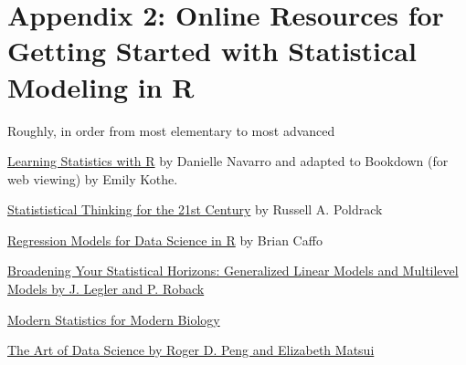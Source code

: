 \documentclass[]{book}
\begin{document}
\chapter*{Appendix 2: Online Resources for Getting Started with
Statistical Modeling in
R}\label{appendix-2-online-resources-for-getting-started-with-statistical-modeling-in-r}

Roughly, in order from most elementary to most advanced

\href{https://https://learningstatisticswithr-bookdown.netlify.com}{Learning
Statistics with R} by Danielle Navarro and adapted to Bookdown (for web
viewing) by Emily Kothe.

\href{http://statsthinking21.org}{Statististical Thinking for the 21st
Century} by Russell A. Poldrack

\href{https://leanpub.com/regmods}{Regression Models for Data Science in
R} by Brian Caffo

\href{https://bookdown.org/roback/bookdown-bysh/}{Broadening Your
Statistical Horizons: Generalized Linear Models and Multilevel Models by
J. Legler and P. Roback}

\href{https://www.huber.embl.de/msmb/index.html}{Modern Statistics for
Modern Biology}

\href{https://bookdown.org/rdpeng/artofdatascience/}{The Art of Data
Science by Roger D. Peng and Elizabeth Matsui}


\end{document}

